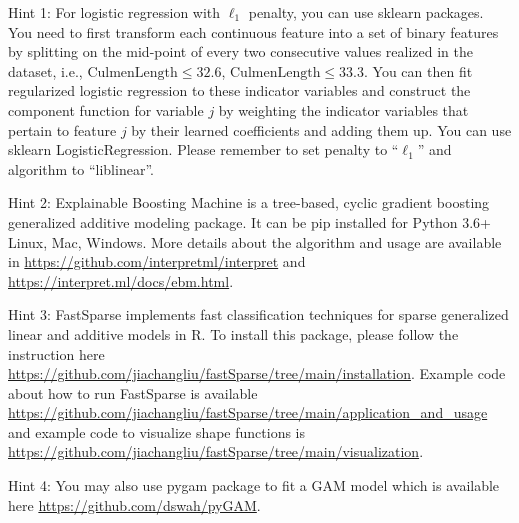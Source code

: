\documentclass{exam}
\begin{document}
\noindent Hint 1: For logistic regression with $\ell_1$ penalty, you can use sklearn packages. You need to first transform each continuous feature into a set of binary features by splitting on the mid-point of every two consecutive values realized in the dataset, i.e., $\textrm{CulmenLength}\leq 32.6$, $\textrm{CulmenLength}\leq 33.3$. You can then fit regularized logistic regression to these indicator variables and construct the component function for variable $j$ by weighting the indicator variables that pertain to feature $j$ by their learned coefficients and adding them up. You can use sklearn LogisticRegression. Please remember to set penalty to ``$\ell_1$'' and algorithm to ``liblinear''. 

\noindent Hint 2: Explainable Boosting Machine is a tree-based, cyclic gradient boosting generalized additive modeling package. It can be pip installed for Python 3.6+ Linux, Mac, Windows. More details about the algorithm and usage are available in \url{https://github.com/interpretml/interpret} and \url{https://interpret.ml/docs/ebm.html}. 

\noindent Hint 3: FastSparse implements fast classification techniques for
sparse generalized linear and additive models in R. To install this package, please follow the instruction here \url{https://github.com/jiachangliu/fastSparse/tree/main/installation}. Example code about how to run FastSparse is available \url{https://github.com/jiachangliu/fastSparse/tree/main/application_and_usage} and example code to visualize shape functions is \url{https://github.com/jiachangliu/fastSparse/tree/main/visualization}. 

\noindent Hint 4: You may also use pygam package to fit a GAM model which is available here \url{https://github.com/dswah/pyGAM}.  
\end{document}
